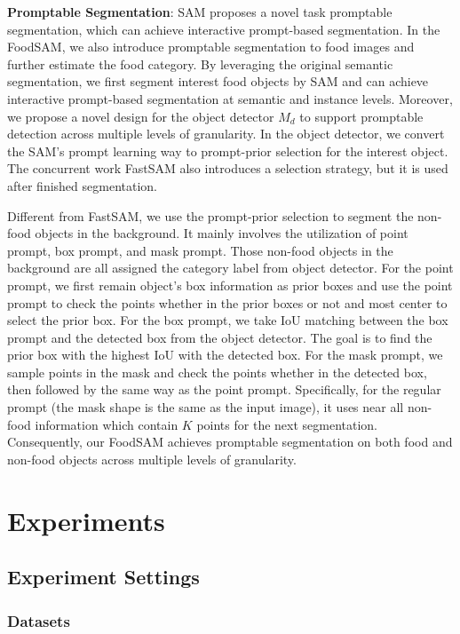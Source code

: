 \documentclass[lettersize,journal]{IEEEtran}
\begin{document}
\textbf{Promptable Segmentation}: SAM proposes a novel task promptable segmentation, which can achieve interactive prompt-based segmentation. 
In the FoodSAM, we also introduce promptable segmentation to food images and further estimate the food category.
By leveraging the original semantic segmentation, we first segment interest food objects by SAM and can achieve interactive prompt-based segmentation at semantic and instance levels. 
Moreover, we propose a novel design for the object detector $M_d$ to support promptable detection across multiple levels of granularity. 
In the object detector, we convert the SAM's prompt learning way to prompt-prior selection for the interest object. 
The concurrent work FastSAM\cite{zhao2023fast} also introduces a selection strategy, but it is used after finished segmentation.

Different from FastSAM, we use the prompt-prior selection to segment the non-food objects in the background. 
It mainly involves the utilization of point prompt, box prompt, and mask prompt. 
Those non-food objects in the background are all assigned the category label from object detector.
For the point prompt, we first remain object's box information as prior boxes and use the point prompt to check the points whether in the prior boxes or not and most center to select the prior box. 
For the box prompt, we take IoU matching between the box prompt and the detected box from the object detector. 
The goal is to find the prior box with the highest IoU with the detected box. 
For the mask prompt, we sample points in the mask and check the points whether in the detected box, then followed by the same way as the point prompt. 
Specifically, for the regular prompt (the mask shape is the same as the input image), it uses near all non-food information which contain $K$ points for the next segmentation. 
Consequently, our FoodSAM achieves promptable segmentation on both food and non-food objects across multiple levels of granularity.



%
 
\section{Experiments}

\subsection{Experiment Settings}

\subsubsection*{Datasets}
\end{document}
